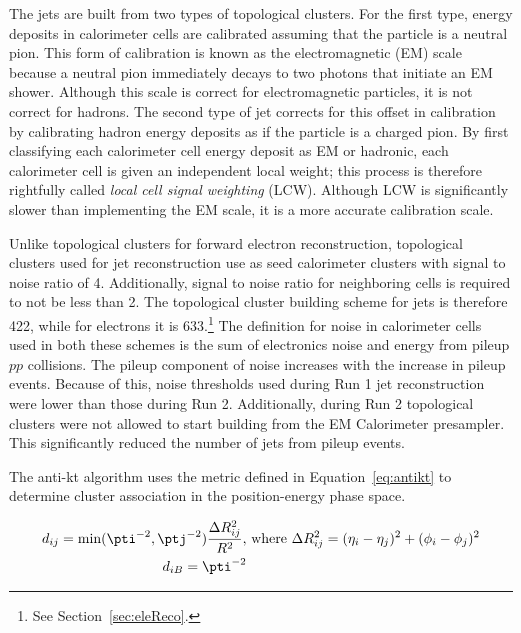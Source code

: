 \par The jets are built from two types of topological clusters. For the 
first type, energy deposits in calorimeter cells are calibrated assuming that 
the particle is a neutral pion. This form of calibration is known as the electromagnetic (EM) scale because a neutral pion 
immediately decays to two photons that initiate an EM shower. Although this scale is correct for 
electromagnetic particles, it is not correct for hadrons. The second type of jet corrects for this 
offset in calibration by calibrating hadron energy deposits as if the particle is a charged pion. By first classifying 
each calorimeter cell energy deposit as EM or hadronic, each calorimeter cell is given an independent 
local weight; this process is therefore rightfully called {\it local cell signal weighting} (LCW).
Although LCW is significantly slower than implementing the EM scale, it is a more accurate calibration scale. 

\par Unlike topological clusters for forward electron reconstruction, topological clusters used 
for jet reconstruction use as seed calorimeter clusters with signal to noise ratio of 4.  
Additionally, signal to noise ratio for neighboring cells is required to not be less than 2.
The topological cluster building scheme for jets is therefore 422, while for electrons it is 633.\footnote{
See Section~\ref{sec:eleReco}.}
The definition for noise in calorimeter cells used in both these schemes is the 
sum of electronics noise and energy from pileup $pp$ collisions. 
The pileup component of noise increases with the increase in pileup events. Because of this, 
noise thresholds used during Run 1 jet reconstruction were lower than those during Run 2.
Additionally, during Run 2 topological clusters were not allowed to start building from 
the EM Calorimeter presampler. This significantly reduced the number of jets from pileup 
events.

\par The anti-kt algorithm uses the metric defined in Equation~\ref{eq:antikt} 
to determine cluster association in the position-energy phase space.

\begin{equation}
\begin{aligned}
d_{ij} = \mbox{min}(\pti^{-2},\ptj^{-2})\frac{\Delta R^2_{ij}}{R^2}, &  \mbox{ where } \Delta R^2_{ij}=(\eta_i-\eta_j)^2+(\phi_i-\phi_j)^2 \\
d_{iB} = \pti^{-2} &  
\end{aligned} 
\label{eq:antikt}
\end{equation}  

